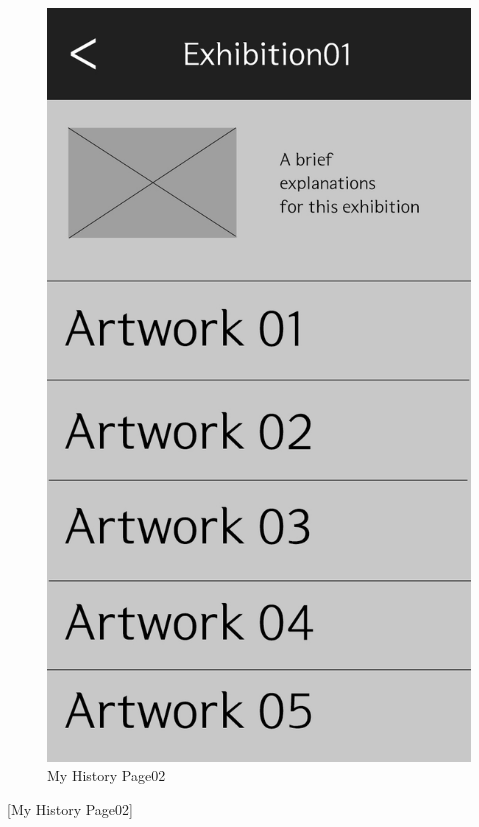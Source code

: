 \documentclass[conference]{IEEEtran}
\begin{document}
\begin{figure}[htbp]
\begin{center}
    \includegraphics[scale=0.2]{img_exhiDetail01}
    \caption{My History Page02} 
\end{center}
\end{figure}

[My History Page02] 
\end{document}
